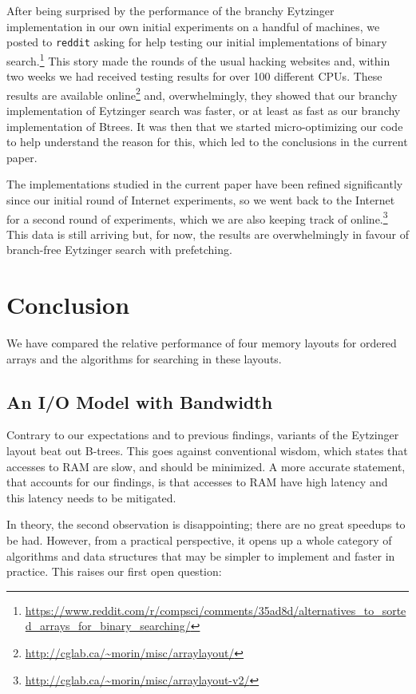 \documentclass{patmorin}
\begin{document}
After being surprised by the performance of the branchy
Eytzinger implementation in our own initial experiments
on a handful of machines, we posted to \texttt{reddit}
asking for help testing our initial implementations of binary
search.\footnote{\url{https://www.reddit.com/r/compsci/comments/35ad8d/alternatives_to_sorted_arrays_for_binary_searching/}}
This story made the rounds of the usual hacking websites
and, within two weeks we had received testing results
for over 100 different CPUs.  These results are available
online\footnote{\url{http://cglab.ca/~morin/misc/arraylayout/}} and,
overwhelmingly, they showed that our branchy implementation of Eytzinger
search was faster, or at least as fast as our branchy implementation
of Btrees.  It was then that we started micro-optimizing our code to
help understand the reason for this, which led to the conclusions in
the current paper.

The implementations studied in the current paper have been
refined significantly since our initial round of Internet
experiments, so we went back to the Internet for a second
round of experiments, which we are also keeping track of
online.\footnote{\url{http://cglab.ca/~morin/misc/arraylayout-v2/}} This
data is still arriving but, for now, the results are overwhelmingly in
favour of branch-free Eytzinger search with prefetching.

\section{Conclusion}

We have compared the relative performance of four memory layouts for
ordered arrays and the algorithms for searching in these layouts.  

\subsection{An I/O Model with Bandwidth}

Contrary to our expectations and to previous findings, variants of the
Eytzinger layout beat out B-trees.  This goes against conventional wisdom,
which states that accesses to RAM are slow, and should be minimized.
A more accurate statement, that accounts for our findings, is that
accesses to RAM have high latency and this latency needs to be mitigated.


In theory, the second observation is disappointing; there are no great
speedups to be had. However, from a practical perspective, it opens up
a whole category of algorithms and data structures that may be simpler
to implement and faster in practice.  This raises our first open question:
\end{document}

